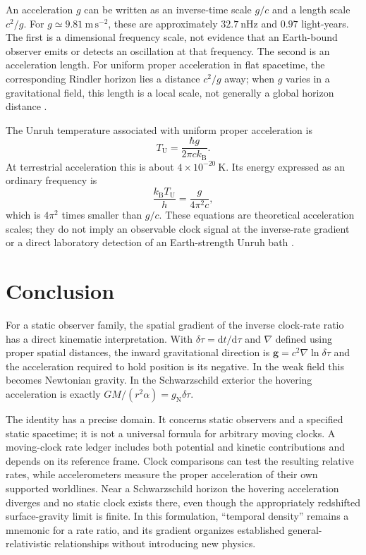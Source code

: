 \documentclass[12pt]{article}
\begin{document}
An acceleration $g$ can be written as an inverse-time scale $g/c$ and a length scale $c^2/g$. For $g\simeq9.81\ \mathrm{m\,s^{-2}}$, these are approximately $32.7\ \mathrm{nHz}$ and $0.97$ light-years. The first is a dimensional frequency scale, not evidence that an Earth-bound observer emits or detects an oscillation at that frequency. The second is an acceleration length. For uniform proper acceleration in flat spacetime, the corresponding Rindler horizon lies a distance $c^2/g$ away; when $g$ varies in a gravitational field, this length is a local scale, not generally a global horizon distance \cite{Rindler}.

The Unruh temperature associated with uniform proper acceleration is
\begin{equation}
  T_{\mathrm{U}}=\frac{\hbar g}{2\pi c k_{\mathrm{B}}}.
  \label{eq:unruh-temperature}
\end{equation}
At terrestrial acceleration this is about $4\times10^{-20}\ \mathrm{K}$. Its energy expressed as an ordinary frequency is
\begin{equation}
  \frac{k_{\mathrm{B}}T_{\mathrm{U}}}{h}
  =\frac{g}{4\pi^2c},
  \label{eq:unruh-frequency}
\end{equation}
which is $4\pi^2$ times smaller than $g/c$. These equations are theoretical acceleration scales; they do not imply an observable clock signal at the inverse-rate gradient or a direct laboratory detection of an Earth-strength Unruh bath \cite{Unruh}.

\section{Conclusion}

For a static observer family, the spatial gradient of the inverse clock-rate ratio has a direct kinematic interpretation. With $\delta\tau=\mathrm{d}t/\mathrm{d}\tau$ and $\nabla$ defined using proper spatial distances, the inward gravitational direction is $\mathbf{g}=c^2\nabla\ln\delta\tau$ and the acceleration required to hold position is its negative. In the weak field this becomes Newtonian gravity. In the Schwarzschild exterior the hovering acceleration is exactly $GM/(r^2\alpha)=g_{\mathrm{N}}\delta\tau$.

The identity has a precise domain. It concerns static observers and a specified static spacetime; it is not a universal formula for arbitrary moving clocks. A moving-clock rate ledger includes both potential and kinetic contributions and depends on its reference frame. Clock comparisons can test the resulting relative rates, while accelerometers measure the proper acceleration of their own supported worldlines. Near a Schwarzschild horizon the hovering acceleration diverges and no static clock exists there, even though the appropriately redshifted surface-gravity limit is finite. In this formulation, ``temporal density'' remains a mnemonic for a rate ratio, and its gradient organizes established general-relativistic relationships without introducing new physics.
\end{document}
